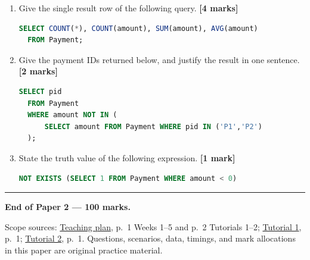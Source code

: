 \begin{enumerate}
\def\labelenumi{\arabic{enumi}.}
\item
  Give the single result row of the following query. \textbf{{[}4 marks{]}}

  \Needspace{60pt}
  \begin{lstlisting}[language=SQL]
  SELECT COUNT(*), COUNT(amount), SUM(amount), AVG(amount)
  FROM Payment;
  \end{lstlisting}
\item
  Give the payment IDs returned below, and justify the result in one sentence. \textbf{{[}2 marks{]}}

  \Needspace{105pt}
  \begin{lstlisting}[language=SQL]
  SELECT pid
  FROM Payment
  WHERE amount NOT IN (
      SELECT amount FROM Payment WHERE pid IN ('P1','P2')
  );
  \end{lstlisting}
\item
  State the truth value of the following expression. \textbf{{[}1 mark{]}}

  \Needspace{45pt}
  \begin{lstlisting}[language=SQL]
  NOT EXISTS (SELECT 1 FROM Payment WHERE amount < 0)
  \end{lstlisting}
\end{enumerate}

\begin{center}\rule{0.5\linewidth}{0.5pt}\end{center}

\textbf{End of Paper 2 --- 100 marks.}

Scope sources: \href{../../../syllabus/CSC5041_Teaching_Plan.pdf}{Teaching plan}, p.~1 Weeks 1--5 and p.~2 Tutorials 1--2; \href{../../../slides/Tutorial1.pdf}{Tutorial 1}, p.~1; \href{../../../slides/Tutorial\%202.pdf}{Tutorial 2}, p.~1. Questions, scenarios, data, timings, and mark allocations in this paper are original practice material.

